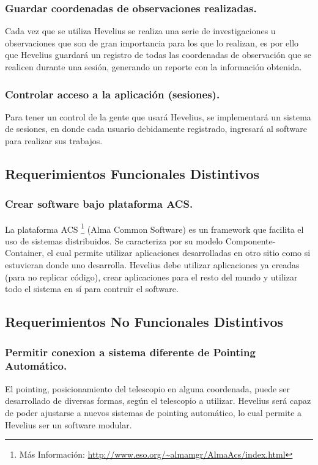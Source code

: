 \documentclass[letterpaper,spanish,10pt]{article}
\begin{document}
\subsubsection{Guardar coordenadas de observaciones realizadas.}
Cada vez que se utiliza Hevelius se realiza una serie de investigaciones u observaciones que son de gran importancia para los que lo realizan, es por ello que Hevelius guardar\'a un registro de todas las coordenadas de observaci\'on que se realicen durante una sesi\'on, generando un reporte con la informaci\'on obtenida.

\subsubsection{Controlar acceso a la aplicaci\'on (sesiones).}
Para tener un control de la gente que usar\'a Hevelius, se implementar\'a un sistema de sesiones, en donde cada usuario debidamente registrado, ingresar\'a al software para realizar sus trabajos.


\subsection{Requerimientos Funcionales Distintivos}
\subsubsection{Crear software bajo plataforma ACS.}
La plataforma ACS \footnote{M\'as Informaci\'on: \url{http://www.eso.org/~almamgr/AlmaAcs/index.html}} (Alma Common Software) es un framework que facilita el uso de sistemas distribuidos. Se caracteriza por su modelo Componente-Container, el cual permite utilizar aplicaciones desarrolladas en otro sitio como si estuvieran donde uno desarrolla. Hevelius debe utilizar aplicaciones ya creadas (para no replicar c\'odigo), crear aplicaciones para el resto del mundo y utilizar todo el sistema en s\'i para contruir el software.


\subsection{Requerimientos No Funcionales Distintivos}
\subsubsection{Permitir conexion a sistema diferente de Pointing Autom\'atico.}
El pointing, posicionamiento del telescopio en alguna coordenada, puede ser desarrollado de diversas formas, seg\'un el telescopio a utilizar. Hevelius ser\'a capaz de poder ajustarse a nuevos sistemas de pointing autom\'atico, lo cual permite a Hevelius ser un software modular.
\end{document}
